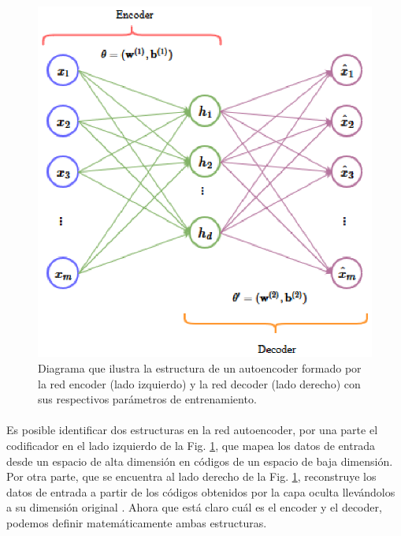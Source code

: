 \documentclass[12pt]{article}%
\begin{document}
\begin{figure}[ht]
  \centering
    \includegraphics{./AE.eps}
  \caption{Diagrama que ilustra la estructura de un autoencoder formado por la red encoder (lado izquierdo) y la red decoder (lado derecho) con sus respectivos parámetros de entrenamiento.}
  \label{fig:ae}
\end{figure}

\paragraph{}
Es posible identificar dos estructuras en la red autoencoder, por una parte el codificador en el lado izquierdo de la Fig. \ref{fig:ae}, que mapea los datos de entrada desde un espacio de alta dimensión en códigos de un espacio de baja dimensión. Por otra parte, que se encuentra al lado derecho de la Fig. \ref{fig:ae}, reconstruye los datos de entrada a partir de los códigos obtenidos por la capa oculta llevándolos a su dimensión original \cite{shao}. Ahora que está claro cuál es el encoder y el decoder, podemos definir matemáticamente ambas estructuras.
\end{document}
